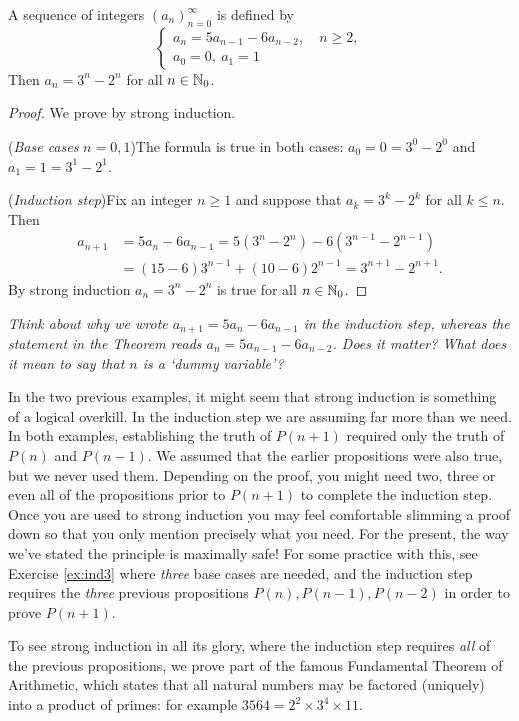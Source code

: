 \begin{thm}{}{}
	A sequence of integers $(a_n)_{n=0}^\infty$ is defined by
	\[
		\begin{cases}
			a_n=5a_{n-1}-6a_{n-2},\quad n\ge 2,\\
			a_0=0,\ a_1=1
		\end{cases}
	\]
	Then $a_n=3^n-2^n$ for all $n\in\mathbb{N}_0$.
\end{thm}

\begin{proof}
	We prove by strong induction.\par
	(\emph{Base cases} $n=0,1$)\quad The formula is true in both cases: $a_0=0=3^0-2^0$ and $a_1=1=3^1-2^1$.\par
	(\emph{Induction step})\quad Fix an integer $n\ge 1$ and suppose that $a_k=3^k-2^k$ for all $k\le n$. Then
	\begin{align*}
		a_{n+1}&=5a_n-6a_{n-1}=5(3^n-2^n)-6(3^{n-1}-2^{n-1})\\
		&=(15-6)3^{n-1}+(10-6)2^{n-1}=3^{n+1}-2^{n+1}.
	\end{align*}
	By strong induction $a_n=3^n-2^n$ is true for all $n\in\mathbb{N}_0$.
\end{proof}

\emph{Think about why we wrote $a_{n+1}=5a_n-6a_{n-1}$ in the induction step, whereas the statement in the Theorem reads $a_n=5a_{n-1}-6a_{n-2}$. Does it matter? What does it mean to say that $n$ is a `dummy variable'?}\par

In the two previous examples, it might seem that strong induction is something of a logical overkill. In the induction step we are assuming far more than we need. In both examples, establishing the truth of $P(n+1)$ required only the truth of $P(n)$ and $P(n-1)$. We assumed that the earlier propositions were also true, but we never used them. Depending on the proof, you might need two, three or even all of the propositions prior to $P(n+1)$ to complete the induction step. Once you are used to strong induction you may feel comfortable slimming a proof down so that you only mention precisely what you need. For the present, the way we've stated the principle is maximally safe! For some practice with this, see Exercise \ref{ex:ind3} where \emph{three} base cases are needed, and the induction step requires the \emph{three} previous propositions $P(n),P(n-1),P(n-2)$ in order to prove $P(n+1)$.\par

To see strong induction in all its glory, where the induction step requires \emph{all} of the previous propositions, we prove part of the famous Fundamental Theorem of Arithmetic, which states that all natural numbers may be factored (uniquely) into a product of primes: for example $3564=2^2\times 3^4\times 11$.



